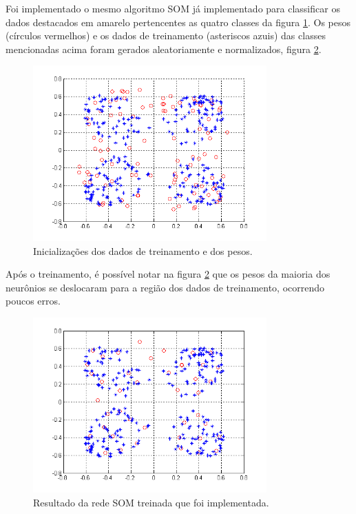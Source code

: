 \documentclass[a4paper,oneside,12pt]{article}
\begin{document}
\begin{enumerate}[1.]
Foi implementado o mesmo algoritmo SOM j\'a implementado para classificar os dados destacados em amarelo pertencentes as quatro classes da figura \ref{fig:q8_4}.
Os pesos (círculos vermelhos) e os dados de treinamento (asteriscos azuis) das classes mencionadas acima foram gerados aleatoriamente e normalizados, figura \ref{fig:q8_5}.

\begin{figure}
\centering
\includegraphics[width=0.8\textwidth]{q8_4.png}
\caption{Inicializa\c{c}\~oes dos dados de treinamento e dos pesos.}
\label{fig:q8_4}
\end{figure}

Ap\'os o treinamento, \'e poss\'ivel notar na figura \ref{fig:q8_5} que os pesos da maioria dos neur\^onios se deslocaram para a regi\~ao dos dados de treinamento, ocorrendo poucos erros.

\begin{figure}
\centering
\includegraphics[width=0.8\textwidth]{q8_5.png}
\caption{Resultado da rede SOM treinada que foi implementada.}
\label{fig:q8_5}
\end{figure}


\end{enumerate}
\end{document}
